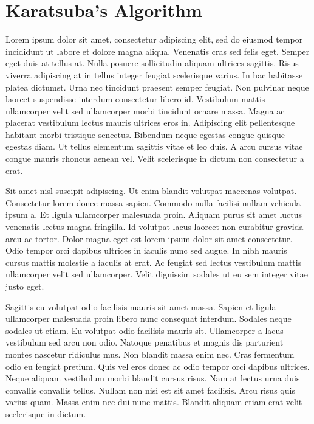 \documentclass[12pt]{article}
\begin{document}
\newpage


\section{Karatsuba's Algorithm}
Lorem ipsum dolor sit amet, consectetur adipiscing elit, sed do eiusmod tempor incididunt ut labore et dolore magna aliqua. Venenatis cras sed felis eget. Semper eget duis at tellus at. Nulla posuere sollicitudin aliquam ultrices sagittis. Risus viverra adipiscing at in tellus integer feugiat scelerisque varius. In hac habitasse platea dictumst. Urna nec tincidunt praesent semper feugiat. Non pulvinar neque laoreet suspendisse interdum consectetur libero id. Vestibulum mattis ullamcorper velit sed ullamcorper morbi tincidunt ornare massa. Magna ac placerat vestibulum lectus mauris ultrices eros in. Adipiscing elit pellentesque habitant morbi tristique senectus. Bibendum neque egestas congue quisque egestas diam. Ut tellus elementum sagittis vitae et leo duis. A arcu cursus vitae congue mauris rhoncus aenean vel. Velit scelerisque in dictum non consectetur a erat.\par
Sit amet nisl suscipit adipiscing. Ut enim blandit volutpat maecenas volutpat. Consectetur lorem donec massa sapien. Commodo nulla facilisi nullam vehicula ipsum a. Et ligula ullamcorper malesuada proin. Aliquam purus sit amet luctus venenatis lectus magna fringilla. Id volutpat lacus laoreet non curabitur gravida arcu ac tortor. Dolor magna eget est lorem ipsum dolor sit amet consectetur. Odio tempor orci dapibus ultrices in iaculis nunc sed augue. In nibh mauris cursus mattis molestie a iaculis at erat. Ac feugiat sed lectus vestibulum mattis ullamcorper velit sed ullamcorper. Velit dignissim sodales ut eu sem integer vitae justo eget.\par
Sagittis eu volutpat odio facilisis mauris sit amet massa. Sapien et ligula ullamcorper malesuada proin libero nunc consequat interdum. Sodales neque sodales ut etiam. Eu volutpat odio facilisis mauris sit. Ullamcorper a lacus vestibulum sed arcu non odio. Natoque penatibus et magnis dis parturient montes nascetur ridiculus mus. Non blandit massa enim nec. Cras fermentum odio eu feugiat pretium. Quis vel eros donec ac odio tempor orci dapibus ultrices. Neque aliquam vestibulum morbi blandit cursus risus. Nam at lectus urna duis convallis convallis tellus. Nullam non nisi est sit amet facilisis. Arcu risus quis varius quam. Massa enim nec dui nunc mattis. Blandit aliquam etiam erat velit scelerisque in dictum.\par
\end{document}
